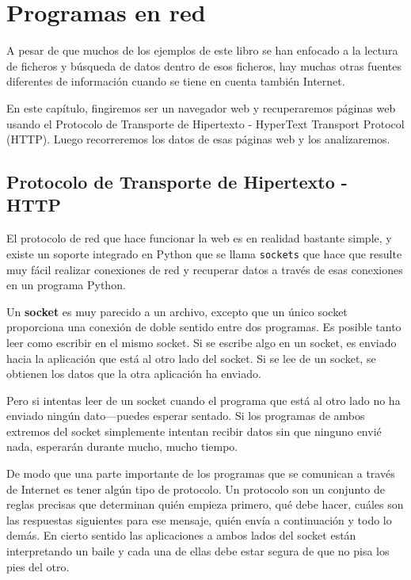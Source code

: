 
\chapter{Programas en red}

A pesar de que muchos de los ejemplos de este libro se han enfocado a la lectura
de ficheros y búsqueda de datos dentro de esos ficheros, hay muchas otras fuentes
diferentes de información cuando se tiene en cuenta también Internet.

En este capítulo, fingiremos ser un navegador web y recuperaremos páginas
web usando el Protocolo de Transporte de Hipertexto - HyperText Transport Protocol (HTTP).
Luego recorreremos los datos de esas páginas web y los analizaremos.

\section{Protocolo de Transporte de Hipertexto - HTTP}

El protocolo de red que hace funcionar la web es en realidad bastante simple, y
existe un soporte integrado en Python que se llama {\tt sockets} que hace que resulte muy
fácil realizar conexiones de red y recuperar datos a través de esas
conexiones en un programa Python.

Un {\bf socket} es muy parecido a un archivo, excepto que un único socket
proporciona una conexión de doble sentido entre dos programas.
Es posible tanto leer como escribir en el mismo socket. Si se escribe algo en
un socket, es enviado hacia la aplicación que está al otro lado del socket. Si se lee
de un socket, se obtienen los datos que la otra aplicación ha enviado.

Pero si intentas leer de un socket cuando el programa que está al otro lado
no ha enviado ningún dato---puedes esperar sentado. Si los programas de ambos extremos
del socket simplemente intentan recibir datos sin que ninguno envié nada, esperarán durante mucho,
mucho tiempo.

De modo que una parte importante de los programas que se comunican a través de Internet es tener algún
tipo de protocolo. Un protocolo son un conjunto de reglas precisas que determinan quién
empieza primero, qué debe hacer, cuáles son las respuestas siguientes para ese mensaje,
quién envía a continuación y todo lo demás. En cierto sentido las aplicaciones a ambos lados del
socket están interpretando un baile y cada una de ellas debe estar segura de que no pisa
los pies del otro.

